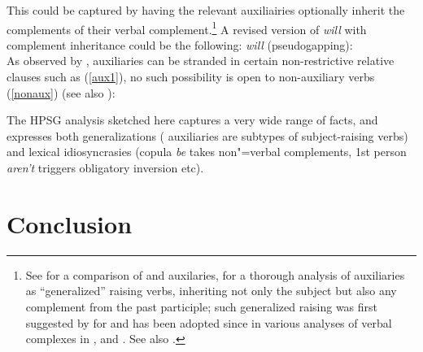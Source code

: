 \documentclass[output=paper
	        ,collection
	        ,collectionchapter
 	        ,biblatex
                ,babelshorthands
                ,newtxmath
                ,draftmode
                ,colorlinks, citecolor=brown
]{langscibook}
\begin{document}
This could be captured by having the relevant auxiliairies optionally inherit the complements of their verbal complement.\footnote{See  for a comparison of  and  auxilaries,  for a thorough analysis of  auxiliaries as ``generalized'' raising verbs, inheriting not only the subject but also any complement from the past participle; such generalized raising was first suggested by \citet{HN89a,HN94a} for  and has been adopted since in various analyses of verbal complexes in  \citep{Kiss95a,Meurers2000b,Kathol2001a,Mueller99a,Mueller2002b},  \citep{BvN98a} and  \citep[Section~4]{MuellerPersian}. See also .}
A revised version of \emph{will} with complement inheritance could be the following:
\ea
\emph{will} (pseudogapping):\\
\z
As observed by \citet{ArnoldandBorsley2008}, auxiliaries can be stranded in certain non-restrictive
relative clauses such as (\ref{aux1}), no such possibility is open to non-auxiliary verbs
(\ref{nonaux}) (see also \crossrefchapteralt[\page \pageref{page-relative-clauses:stranded-aux}]{relative-clauses}):

\eal
{}
\zl

The HPSG analysis sketched here captures a very wide range of facts, and expresses both generalizations ( auxiliaries are subtypes of subject-raising verbs) and lexical idiosyncrasies (copula \emph{be} takes non"=verbal complements, 1st person \emph{aren't} triggers obligatory inversion etc).


	
\section{Conclusion}
\end{document}

